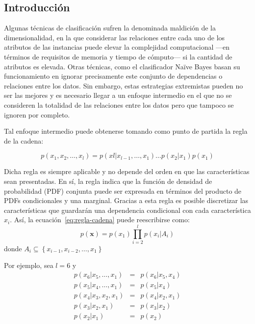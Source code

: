 \documentclass{article}
\begin{document}
\subsection{Introducción} 
\label{sub:introduccion}
Algunas técnicas de clasificación sufren la denominada maldición de la dimensionalidad, en la que considerar las relaciones entre cada uno de los atributos de las instancias puede elevar la complejidad computacional ---en términos de requisitos de memoria y tiempo de cómputo--- si la cantidad de atributos es elevada.
Otras técnicas, como el clasificador Naïve Bayes basan su funcionamiento en ignorar precisamente este conjunto de dependencias o relaciones entre los datos.
Sin embargo, estas estrategias extremistas pueden no ser las mejores y es necesario llegar a un enfoque intermedio en el que no se consideren la totalidad de las relaciones entre los datos pero que tampoco se ignoren por completo.

Tal enfoque intermedio puede obtenerse tomando como punto de partida la regla de la cadena:

\begin{equation}
	p(x_1, x_2, \ldots, x_l) = p(xl | x_{l-1}, \ldots, x_1)\ldots p(x_2 | x_1) p(x_1)
	\label{eq:regla-cadena}
\end{equation}

Dicha regla es siempre aplicable y no depende del orden en que las características sean presentadas.
En sí, la regla indica que la función de densidad de probabilidad (PDF) conjunta puede ser expresada en términos del producto de PDFs condicionales y una marginal.
Gracias a esta regla es posible discretizar las características que guardarán una dependencia condicional con cada característica $x_i$.
Así, la ecuación~\ref{eq:regla-cadena} puede reescribirse como:
\begin{equation}
	p(\mathbf{x}) = p(x_1)\prod_{i = 2}^{l}p(x_i | A_i)
\end{equation}
donde $A_i \subseteq \left \{ x_{i-1}, x_{i-2}, \ldots , x_1  \right \}$

Por ejemplo, sea $l = 6$ y
\begin{eqnarray}
p(x_6 | x_5, \ldots , x_1)	&=& p(x_6 | x_5, x_4) 	\\
p(x_5 | x_4, \ldots, x_1) 	&=& p(x_5 | x_4)		\\
p(x_4 | x_3, x_2, x_1) 		&=& p(x_4 | x_2, x_1)	\\
p(x_3 | x_2, x_1)			&=& p(x_3 | x_2)		\\
p(x_2 | x_1)				&=& p(x_2)
\end{eqnarray}
\end{document}
